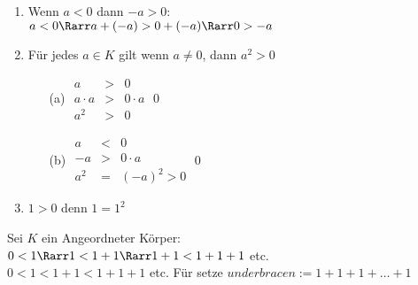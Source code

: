 	\begin{enumerate}
	\item{Wenn $a < 0$ dann $-a > 0$:\\
	$a < 0 \Rarr a + (-a) > 0 + (-a) \Rarr 0 > -a$}
	\item{Für jedes $a \in K $ gilt wenn $a \neq 0$, dann $a^2 > 0$\\
	\begin{itemize}
	\item[(a)]{$\begin{array}{ccc}
	a &>& 0\\
	a · a &>& 0 · a\\
	a^2 &>& 0
	\end{array}$\qed}
	\item[(b)]{$\begin{array}{ccc}
		a &<& 0\\
		-a &>& 0 · a\\
		a^2 &=& (-a)^2 > 0
		\end{array}$\qed}
	\end{itemize}}
	\item{$1 > 0 $ denn $1 = 1^2$}
	\end{enumerate}
	Sei $K$ ein Angeordneter Körper:\\
	$0 < 1 \Rarr 1 < 1 + 1 \Rarr 1 + 1 < 1 + 1 + 1 $ etc.\\
	$0 < 1 < 1 + 1 < 1 + 1 +1 $ etc.
	Für \nN{} setze $underbrace{n:= 1 + 1 + 1 + … + 1}$
	